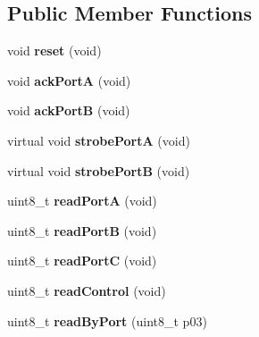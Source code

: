 \subsection*{Public Member Functions}
\begin{DoxyCompactItemize}
\item 
\hypertarget{classIntel8255_ad140a9c3a8dda8fc954a8f25c4d1bfca}{void {\bfseries reset} (void)}\label{classIntel8255_ad140a9c3a8dda8fc954a8f25c4d1bfca}

\item 
\hypertarget{classIntel8255_a1a94705b45a2560e8a81cc2bd5a4275a}{void {\bfseries ack\-Port\-A} (void)}\label{classIntel8255_a1a94705b45a2560e8a81cc2bd5a4275a}

\item 
\hypertarget{classIntel8255_af08c9c489604d0eb1340f41e71a7bdc5}{void {\bfseries ack\-Port\-B} (void)}\label{classIntel8255_af08c9c489604d0eb1340f41e71a7bdc5}

\item 
\hypertarget{classIntel8255_a7794eec4462ed1d6b3888b9af91445c6}{virtual void {\bfseries strobe\-Port\-A} (void)}\label{classIntel8255_a7794eec4462ed1d6b3888b9af91445c6}

\item 
\hypertarget{classIntel8255_aa3fece75effbbf7eeb60a2a44976f1d3}{virtual void {\bfseries strobe\-Port\-B} (void)}\label{classIntel8255_aa3fece75effbbf7eeb60a2a44976f1d3}

\item 
\hypertarget{classIntel8255_a751260da953e9f51d5537664cc6e0173}{uint8\-\_\-t {\bfseries read\-Port\-A} (void)}\label{classIntel8255_a751260da953e9f51d5537664cc6e0173}

\item 
\hypertarget{classIntel8255_a0b4e956de16abf229c6599e8eedbe887}{uint8\-\_\-t {\bfseries read\-Port\-B} (void)}\label{classIntel8255_a0b4e956de16abf229c6599e8eedbe887}

\item 
\hypertarget{classIntel8255_a8d19749a800aa3250004d744d0fa6da8}{uint8\-\_\-t {\bfseries read\-Port\-C} (void)}\label{classIntel8255_a8d19749a800aa3250004d744d0fa6da8}

\item 
\hypertarget{classIntel8255_ab997e7e58d497ed718396817a786892a}{uint8\-\_\-t {\bfseries read\-Control} (void)}\label{classIntel8255_ab997e7e58d497ed718396817a786892a}

\item 
\hypertarget{classIntel8255_a248d0ab5644eca500f58c73c6dbbdbf9}{uint8\-\_\-t {\bfseries read\-By\-Port} (uint8\-\_\-t p03)}\label{classIntel8255_a248d0ab5644eca500f58c73c6dbbdbf9}


\end{DoxyCompactItemize}
